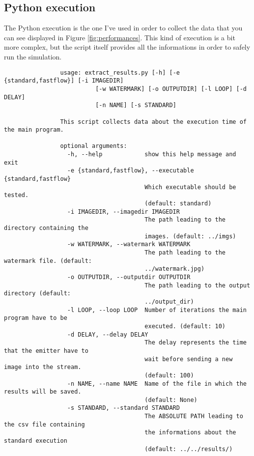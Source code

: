         \subsection{Python execution} %
        \label{sub:python_execution}
            The Python execution is the one I've used in order to collect the data that you can see displayed in
            Figure \ref{fig:performances}. This kind of execution is a bit more complex, but the script itself
            provides all the informations in order to safely run the simulation.

            \begin{verbatim}
                usage: extract_results.py [-h] [-e {standard,fastflow}] [-i IMAGEDIR]
                          [-w WATERMARK] [-o OUTPUTDIR] [-l LOOP] [-d DELAY]
                          [-n NAME] [-s STANDARD]

                This script collects data about the execution time of the main program.

                optional arguments:
                  -h, --help            show this help message and exit
                  -e {standard,fastflow}, --executable {standard,fastflow}
                                        Which executable should be tested.
                                        (default: standard)
                  -i IMAGEDIR, --imagedir IMAGEDIR
                                        The path leading to the directory containing the
                                        images. (default: ../imgs)
                  -w WATERMARK, --watermark WATERMARK
                                        The path leading to the watermark file. (default:
                                        ../watermark.jpg)
                  -o OUTPUTDIR, --outputdir OUTPUTDIR
                                        The path leading to the output directory (default:
                                        ../output_dir)
                  -l LOOP, --loop LOOP  Number of iterations the main program have to be
                                        executed. (default: 10)
                  -d DELAY, --delay DELAY
                                        The delay represents the time that the emitter have to
                                        wait before sending a new image into the stream.
                                        (default: 100)
                  -n NAME, --name NAME  Name of the file in which the results will be saved.
                                        (default: None)
                  -s STANDARD, --standard STANDARD
                                        The ABSOLUTE PATH leading to the csv file containing
                                        the informations about the standard execution
                                        (default: ../../results/)
            \end{verbatim}

